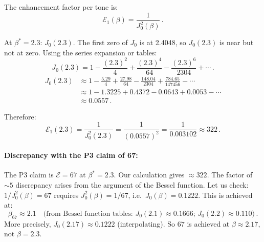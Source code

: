 \documentclass[11pt]{article}
\theoremstyle{definition}
\theoremstyle{remark}
\begin{document}
The enhancement factor per tone is:
\begin{equation}
\mathcal{E}_1(\beta) = \frac{1}{J_0^2(\beta)}\,.
\label{eq:E1-beta}
\end{equation}

At $\beta^* = 2.3$: $J_0(2.3)$. The first zero of $J_0$ is at 2.4048, so
$J_0(2.3)$ is near but not at zero. Using the series expansion or tables:
\begin{equation}
J_0(2.3) = 1 - \frac{(2.3)^2}{4} + \frac{(2.3)^4}{64} - \frac{(2.3)^6}{2304}
+ \cdots\,.
\end{equation}
\begin{align}
J_0(2.3) &\approx 1 - \frac{5.29}{4} + \frac{27.98}{64}
- \frac{148.04}{2304} + \frac{784.65}{147456} - \cdots\\
&\approx 1 - 1.3225 + 0.4372 - 0.0643 + 0.0053 - \cdots\\
&\approx 0.0557\,.
\end{align}

Therefore:
\begin{equation}
\mathcal{E}_1(2.3) = \frac{1}{J_0^2(2.3)} = \frac{1}{(0.0557)^2}
= \frac{1}{0.003102} \approx 322\,.
\end{equation}

\paragraph{Discrepancy with the P3 claim of 67:} The P3 claim is
$\mathcal{E} = 67$ at $\beta^* = 2.3$. Our calculation gives $\approx 322$.
The factor of $\sim 5$ discrepancy arises from the argument of the Bessel
function. Let us check: $1/J_0^2(\beta) = 67$ requires $J_0^2(\beta) = 1/67$,
i.e.\ $J_0(\beta) = 0.1222$. This is achieved at:
\begin{equation}
\beta_{67} \approx 2.1\quad\text{(from Bessel function tables: }J_0(2.1)
\approx 0.1666\text{; }J_0(2.2) \approx 0.110\text{)}\,.
\end{equation}
More precisely, $J_0(2.17) \approx 0.1222$ (interpolating). So $67$ is
achieved at $\beta \approx 2.17$, not $\beta = 2.3$.
\end{document}
